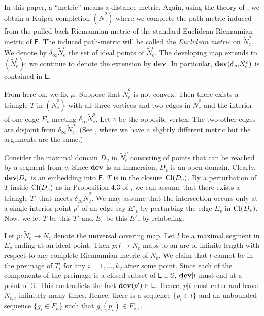 \documentclass{amsart}
\numberwithin{equation}{section}
\newcommand\dev{{\bf dev}}
\newcommand\clo{{\rm Cl}}
\newcommand\ra{\rightarrow}
\newcommand\che{\check}
\newcommand\Ss{{\mathbb{S}}}
\newcommand\Lspace{\mathsf E}
\theoremstyle{definition}
\theoremstyle{remark}
\newcommand{\romec}{\mathrm{c}}
\newcommand{\romecr}{{\mathrm{c}, \mathrm{r}}}
\begin{document}
In this paper, a ``metric'' means a distance metric. 
Again, using the theory of \cite{psconv}, we obtain a Kuiper completion 
$(\tilde N_{\romec} ^o)\che{}$ where we complete the path-metric
induced from the pulled-back Riemannian metric of the standard Euclidean Riemannian 
metric of $\Lspace$. 
The induced path-metric will be called the {\em Euclidean metric} on $\tilde N_{\romec}^o$. 
We denote by $\delta_\infty \tilde N_{\romec}^o$ the set of ideal points
of $\tilde N_{\romec}^o$.
The developing map extends to $(\tilde N_{\romec}^o)\che{}$; 
we continue to denote the extension by 
$\dev$. 
In particular, $\dev(\delta_\infty \tilde N_{\romec}^o)$ is 
contained in $\Lspace$. 

From here on, we fix $\mu$. 
Suppose that $\tilde N_{\romec} ^o$ is not convex. 
Then there exists a triangle $T$ in $(\tilde N_{\romec} ^o)\che{}$ 
with all three vertices and two edges in $\tilde N_{\romec} ^o$
and the interior of
 one edge $E_v$ meeting $\delta_\infty \tilde N_{\romec} ^o$.
Let $v$ be the opposite vertex. 
The two other edges are disjoint from $\delta_\infty \tilde N_{\romec} ^o$. 
(See \cite{CG93}, where 
we have a slightly different metric but the arguments 
are the same.)

 

Consider the maximal domain $D_v$ in $\tilde N_{\romec} ^o$
consisting of points that can be reached by a segment from $v$. 
Since $\dev$ is an immersion, $D_v$ is an open domain.
Clearly, $\dev| D_v$ is an embedding into $\Lspace$. 
$T$ is in the closure $\clo(D_v)$. 
By a perturbation of $T$ inside $\clo(D_v)$ as in Proposition 4.3 of \cite{psconv}, 
we can assume that there exists a triangle $T'$ that meets 
$\delta_\infty \tilde N_{\romec} ^o$. 
We may assume that the intersection occurs only at 
a single interior point $p'$ of an edge say $E'_v$
by perturbing the edge $E_v$ in $\clo(D_v)$. 
Now, we let $T$ be this $T'$ and $E_v$ be this $E'_v$ by relabeling. 

Let $p:\tilde N_{\romec}  \ra N_{\romec} $ denote the universal covering map. 
Let $l$ be a maximal segment in $E_v$ ending at an ideal point. 
Then $p: l\ra N_{\romec} $ maps to an arc of infinite length 
with respect to any complete Riemannian metric of $N_{\romec} $. 
We claim that $l$ cannot be in the preimage of $T_i$ for any $i=1, \dots, k_v$ 
after some point. Since each of the components of the preimage is 
a closed subset of $\Lspace \cup \Ss$, 
$\dev|l$ must end at a point of $\Ss$. 
This contradicts the fact $\dev(p') \in \Lspace$. 
Hence, $p| l$ must enter and leave $N_{\romecr} $ infinitely many times. 
Hence, there is a sequence $\{p_i\in l\}$ and an 
unbounded sequence $\{g_i \in F_n\}$ such that 
$g_i(p_i) \in F_{\romecr}$.
\end{document}
